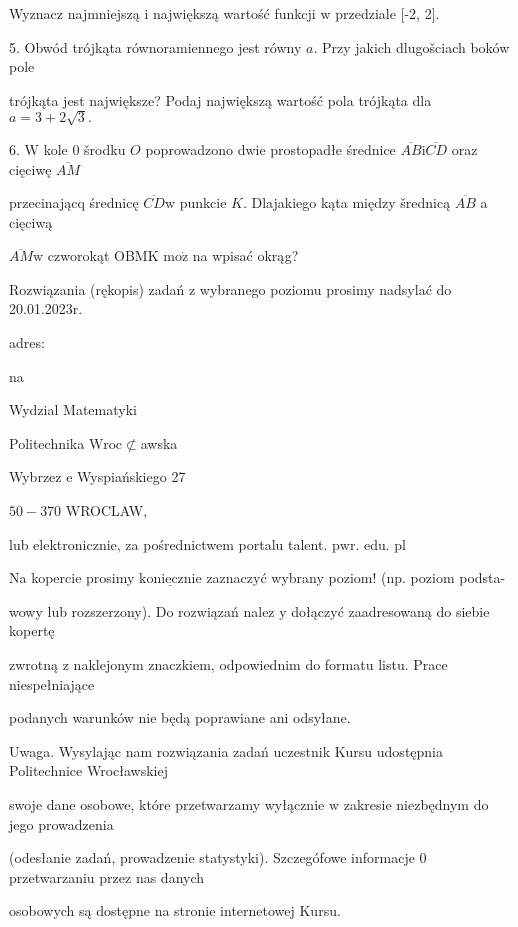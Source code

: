 \documentclass[a4paper,12pt]{article}
\begin{document}
Wyznacz najmniejszą $\mathrm{i}$ największą wartość funkcji $\mathrm{w}$ przedziale [-2, 2].

5. Obwód trójkąta równoramiennego jest równy $a$. Przy jakich dlugošciach boków pole

trójkąta jest największe? Podaj największą wartość pola trójkąta dla $a=3+2\sqrt{3}.$

6. $\mathrm{W}$ kole $0$ šrodku $O$ poprowadzono dwie prostopadłe średnice $\overline{AB}\mathrm{i}\overline{CD}$ oraz cięciwę $\overline{AM}$

przecinającq średnicę $\overline{CD}\mathrm{w}$ punkcie $K$. Dlajakiego kąta między šrednicą $\overline{AB}$ a cięciwą

$\overline{AM}\mathrm{w}$ czworokąt OBMK $\mathrm{m}\mathrm{o}\dot{\mathrm{z}}$ na wpisać okrąg?

Rozwiązania (rękopis) zadań z wybranego poziomu prosimy nadsylać do 20.01.2023r.

adres:

na

Wydzial Matematyki

Politechnika $\mathrm{W}\mathrm{r}\mathrm{o}\mathrm{c}\not\subset$awska

Wybrzez $\mathrm{e}$ Wyspiańskiego 27

$50-370$ WROCLAW,

lub elektronicznie, za pośrednictwem portalu talent. $\mathrm{p}\mathrm{w}\mathrm{r}$. edu. pl

Na kopercie prosimy $\underline{\mathrm{k}\mathrm{o}\mathrm{n}\mathrm{i}\mathrm{e}\mathrm{c}\mathrm{z}\mathrm{n}\mathrm{i}\mathrm{e}}$ zaznaczyć wybrany poziom! (np. poziom podsta-

wowy lub rozszerzony). Do rozwiązań nalez $\mathrm{y}$ dołączyć zaadresowaną do siebie kopertę

zwrotną $\mathrm{z}$ naklejonym znaczkiem, odpowiednim do formatu listu. Prace niespełniające

podanych warunków nie będą poprawiane ani odsyłane.

Uwaga. Wysylając nam rozwiązania zadań uczestnik Kursu udostępnia Politechnice Wrocławskiej

swoje dane osobowe, które przetwarzamy wyłącznie $\mathrm{w}$ zakresie niezbędnym do jego prowadzenia

(odesłanie zadań, prowadzenie statystyki). Szczegófowe informacje $0$ przetwarzaniu przez nas danych

osobowych są dostępne na stronie internetowej Kursu.
\end{document}
